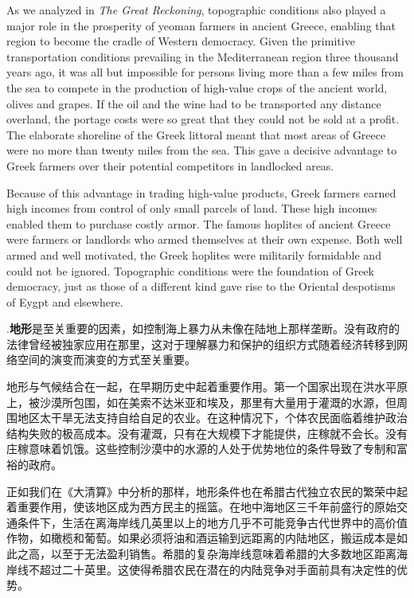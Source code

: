 \begin{paracol}{2}
As we analyzed in \emph{The Great Reckoning}, topographic conditions also played a major role in the prosperity of yeoman farmers in ancient Greece, enabling that region to become the cradle of Western democracy. Given the primitive transportation conditions prevailing in the Mediterranean region three thousand years ago, it was all but impossible for persons living more than a few miles from the sea to compete in the production of high-value crops of the ancient world, olives and grapes. If the oil and the wine had to be transported any distance overland, the portage costs were so great that they could not be sold at a profit. The elaborate shoreline of the Greek littoral meant that most areas of Greece were no more than twenty miles from the sea. This gave a decisive advantage to Greek farmers over their potential competitors in landlocked areas.

Because of this advantage in trading high-value products, Greek farmers earned high incomes from control of only small parcels of land. These high incomes enabled them to purchase costly armor. The famous hoplites of ancient Greece were farmers or landlords who armed themselves at their own expense. Both well armed and well motivated, the Greek hoplites were militarily formidable and could not be ignored. Topographic conditions were the foundation of Greek democracy, just as those of a different kind gave rise to the Oriental despotisms of Eygpt and elsewhere.


.\textbf{地形}是至关重要的因素，如控制海上暴力从未像在陆地上那样垄断。没有政府的法律曾经被独家应用在那里，这对于理解暴力和保护的组织方式随着经济转移到网络空间的演变而演变的方式至关重要。

地形与气候结合在一起，在早期历史中起着重要作用。第一个国家出现在洪水平原上，被沙漠所包围，如在美索不达米亚和埃及，那里有大量用于灌溉的水源，但周围地区太干旱无法支持自给自足的农业。在这种情况下，个体农民面临着维护政治结构失败的极高成本。没有灌溉，只有在大规模下才能提供，庄稼就不会长。没有庄稼意味着饥饿。这些控制沙漠中的水源的人处于优势地位的条件导致了专制和富裕的政府。

正如我们在《大清算》中分析的那样，地形条件也在希腊古代独立农民的繁荣中起着重要作用，使该地区成为西方民主的摇篮。在地中海地区三千年前盛行的原始交通条件下，生活在离海岸线几英里以上的地方几乎不可能竞争古代世界中的高价值作物，如橄榄和葡萄。如果必须将油和酒运输到远距离的内陆地区，搬运成本是如此之高，以至于无法盈利销售。希腊的复杂海岸线意味着希腊的大多数地区距离海岸线不超过二十英里。这使得希腊农民在潜在的内陆竞争对手面前具有决定性的优势。


\end{paracol}
